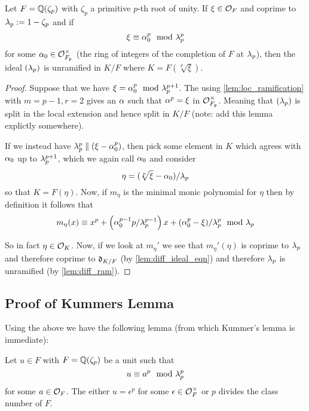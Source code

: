 \begin{lemma}\label{lem:ramification_lem}
	Let $F=\mathbb{Q}(\zeta_p)$ with $\zeta_p$ a primitive $p$-th root of unity. If $\xi \in \mathcal{O}_F$ and coprime to $\lambda_p:=1-\zeta_p$ and if \[\xi \equiv \alpha_0^p \mod {\lambda}_p^p  \] for some $\alpha_0 \in \mathcal{O}_{F_{\mathfrak{p}}}^\times$ (the ring of integers of the completion of $F$ at $\lambda_p$), then the ideal $(\lambda_p)$ is unramified in $K/F$ where $K=F(\sqrt[p]{\xi})$.
\end{lemma}
\begin{proof}
    Suppose that we have $\xi = \alpha_0^p \mod {\lambda}_p^{p+1}$. The using \ref{lem:loc_ramification} with $m=p-1,r=2$ gives an $\alpha$ such that $\alpha^p=\xi$ in $\mathcal{O}_{F_{\mathfrak{p}}}^\times$. Meaning that $(\lambda_p)$ is split in the local extension and hence split in $K/F$ (note: add this lemma explictly somewhere).

    If we instead have $\lambda_p^p \parallel (\xi-\alpha_0^p)$, then pick some element in $ K$ which agrees with $\alpha_0$ up to $\lambda_p^{p+1}$, which we again call $\alpha_0$ and consider \[\eta= (\sqrt[p]{\xi}-\alpha_0)/\lambda_p\] so that $K=F(\eta)$. Now, if $m_\eta$ is the minimal monic polynomial for $\eta$ then by definition it follows that \[m_\eta(x) \equiv x^p+\left (\alpha_0^{p-1}p/\lambda_p^{p-1} \right )x+ (\alpha_0^p-\xi)/\lambda_p^p \mod {\lambda}_p\]

    So in fact $\eta \in \mathcal{O}_K$. Now, if we look at $m_\eta'$ we see that $m_\eta'(\eta)$ is coprime to $\lambda_p$  and therefore coprime to $\mathfrak{d}_{K/F}$ (by \ref{lem:diff_ideal_eqn})  and therefore $\lambda_p$ is unramified (by \ref{lem:diff_ram}).

\end{proof}



\subsection{Proof of Kummers Lemma}
Using the above we have the following lemma (from which Kummer's lemma is immediate):


\begin{lemma}\label{Kummer_alt}
Let $u \in F$ with $F=\mathbb{Q}(\zeta_p)$ be a unit such that \[u \equiv a^p \mod {\lambda}_p^p\] for some $a \in \mathcal{O}_F$. The either $u = \epsilon^p$ for some $\epsilon \in \mathcal{O}_F^\times$ or $p$ divides the class number of $F$.

\end{lemma}

